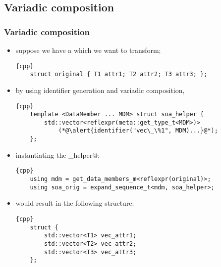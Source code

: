 \documentclass[compress,table,xcolor=table]{beamer}
\begin{document}
\subsection{Variadic composition}
\begin{frame}[fragile]
\frametitle{Variadic composition}
  \small
    \begin{itemize}
      \item suppose we have a \verb@struct@ which we want to transform;
      \begin{lstlisting}{cpp}
	struct original { T1 attr1; T2 attr2; T3 attr3; };
      \end{lstlisting}
      \item by using identifier generation and variadic composition,
      \begin{lstlisting}{cpp}
	template <DataMember ... MDM> struct soa_helper {
	    std::vector<reflexpr(meta::get_type_t<MDM>)>
	        (*@\alert{identifier("vec\_\%1", MDM)...}@*);
	};
      \end{lstlisting}
      \item instantiating the \verb@soa_helper@:
      \begin{lstlisting}{cpp}
	using mdm = get_data_members_m<reflexpr(original)>;
	using soa_orig = expand_sequence_t<mdm, soa_helper>;
      \end{lstlisting}
      \item would result in the following structure:
      \begin{lstlisting}{cpp}
	struct {
	    std::vector<T1> vec_attr1;
	    std::vector<T2> vec_attr2;
	    std::vector<T3> vec_attr3;
	};
      \end{lstlisting}
    \end{itemize}
\end{frame}
\end{document}
